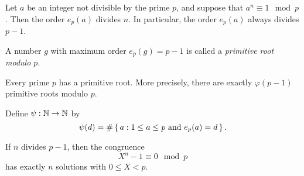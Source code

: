 \documentclass[10pt]{article}
\begin{document}
\begin{theorem}[\textcolor{red}{Order Divisibility Property}]
    Let $a$ be an integer not divisible by the prime $p$, and suppose that $a^n \equiv 1 \mod{p}$. Then the order $e_p(a)$ divides $n$. In particular, the order $e_p(a)$ always divides $p-1$. 
\end{theorem}

\begin{definition*}[\textcolor{red}{Primitve Root modulo $p$}]
    A number $g$ with maximum order $e_p(g)=p-1$ is called a \textit{primitive root modulo $p$}.
\end{definition*}

\begin{theorem}[\textcolor{red}{Primitve Root Theorem}]
    Every prime $p$ has a primitive root. More precisely, there are exactly $\varphi(p-1)$ primitive roots modulo $p$.
\end{theorem}

\begin{definition*}
    Define $\psi: \mathbb{N} \to \mathbb{N}$ by
    \[\psi(d)=\#\set{a: 1 \leq a \leq p \ \textnormal{and} \ e_p(a)=d} .\]
\end{definition*}

\begin{proposition*}
    If $n$ divides $p-1$, then the congruence
    \[X^n -1 \equiv 0 \mod{p}\]
    has exactly $n$ solutions with $0 \leq X < p$.
\end{proposition*}
\end{document}
